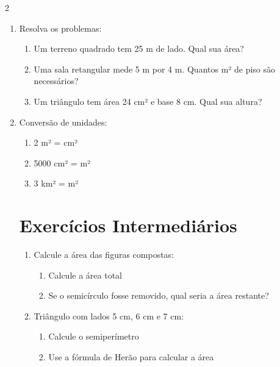 \documentclass[11pt]{article}
\begin{document}
\begin{multicols}{2}
\begin{enumerate}[leftmargin=*]
\item Resolva os problemas:
\begin{enumerate}[label=\alph*)]
\item Um terreno quadrado tem 25 m de lado. Qual sua área?
\item Uma sala retangular mede 5 m por 4 m. Quantos m² de piso são necessários?
\item Um triângulo tem área 24 cm² e base 8 cm. Qual sua altura?
\end{enumerate}

\item Conversão de unidades:
\begin{enumerate}[label=\alph*)]
\item 2 m² = \underline{\hspace{1cm}} cm²
\item 5000 cm² = \underline{\hspace{1cm}} m²
\item 3 km² = \underline{\hspace{1cm}} m²
\end{enumerate}

\section*{Exercícios Intermediários}

\begin{enumerate}[leftmargin=*, start=6]

\item Calcule a área das figuras compostas:

\begin{center}
\end{center}

\begin{enumerate}[label=\alph*)]
\item Calcule a área total
\item Se o semicírculo fosse removido, qual seria a área restante?
\end{enumerate}

\item Triângulo com lados 5 cm, 6 cm e 7 cm:
\begin{enumerate}[label=\alph*)]
\item Calcule o semiperímetro
\item Use a fórmula de Herão para calcular a área
\end{enumerate}


\end{enumerate}
\end{enumerate}
\end{multicols}
\end{document}
